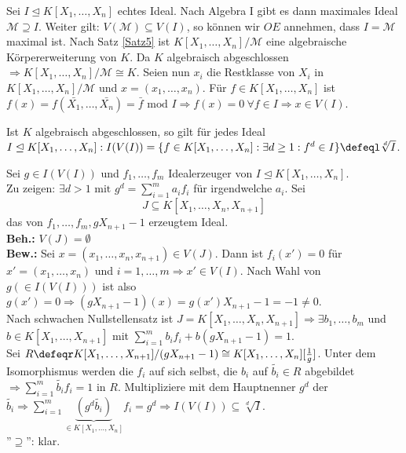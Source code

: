 \begin{Bew}
  Sei $I \trianglelefteq K[X_1, \dots, X_n]$ echtes Ideal. Nach Algebra I gibt es dann maximales Ideal $\mathcal{M} \supseteq I$. Weiter gilt: $V(\mathcal{M}) \subseteq V(I)$, so können wir $O\!\!E$ annehmen, dass $I = \mathcal{M}$ maximal ist.
  Nach Satz \ref{Satz5} ist $K[X_1, \dots, X_n]/\mathcal{M}$ eine algebraische Körpererweiterung von $K$.
  Da $K$ algebraisch abgeschlossen $\Rightarrow K[X_1, \dots, X_n]/\mathcal{M} \cong K$.
  Seien nun $x_i$ die Restklasse von $X_i$ in $K[X_1, \dots, X_n]/\mathcal{M}$ und $x = (x_1, \dots, x_n)$.
  Für $f \in K[X_1, \dots, X_n]$ ist $f(x) = f(\bar{X_1}, \dots, \bar{X_n}) = \bar{f} \mbox{ mod } I \Rightarrow f(x) = 0\ \forall f \in I \Rightarrow x \in V(I)$.
\end{Bew}

\begin{nnSatz}
  Ist $K$ algebraisch abgeschlossen, so gilt für jedes Ideal $I \trianglelefteq K[X_1, \dots, X_n]: I(V(I)) = \{ f \in K[X_1, \dots, X_n]: \exists d \ge 1: f^d \in I \} \defeql \sqrt[d]{I}$.
\end{nnSatz}

\begin{Bew}
  Sei $g \in I(V(I))$ und $f_1, \dots, f_m$ Idealerzeuger von $I \trianglelefteq K[X_1, \dots, X_n]$.\\
  Zu zeigen: $\exists d > 1 \mbox{ mit } g^d = \sum_{i = 1}^m a_i f_i$ für irgendwelche $a_i$.
  Sei 
  \[
  J \subseteq K[X_1, \dots, X_n, X_{n+1}]
  \]
  das von $f_1, \dots, f_m, gX_{n+1}-1$ erzeugtem Ideal.\\
  \textbf{Beh.:} $V(J) = \emptyset$\\
  \textbf{Bew.:} Sei $x = (x_1, \dots, x_n, x_{n+1}) \in V(J)$.
  Dann ist $f_i(x') = 0$ für $x' = (x_1, \dots, x_n)$ und $i = 1, \dots, m \Rightarrow x' \in V(I)$.
  Nach Wahl von $g (\in I(V(I)))$ ist also $g(x') = 0 \Rightarrow (gX_{n+1}-1)(x) = g(x') X_{n+1} - 1 = -1 \not= 0$.\\
  Nach schwachen Nullstellensatz ist $J = K[X_1, \dots, X_n,X_{n+1}] \Rightarrow \exists b_1,
  \dots, b_m$ und $b \in K[X_1, \dots, X_{n+1}]$ mit $\sum_{i=1}^m b_i f_i + b(gX_{n+1} - 1) = 1$.\\
  Sei $R \defeqr K[X_1, \dots, X_{n+1}]/ (gX_{n+1} - 1) \cong K[X_1, \dots, X_n][\frac{1}{g}]$. Unter dem Isomorphismus werden die $f_i$ auf sich selbst, die $b_i$ auf $\tilde{b_i} \in R$ abgebildet $\Rightarrow \sum_{i = 1}^m \tilde{b_i} f_i = 1 \mbox{ in } R$.
  Multipliziere mit dem Hauptnenner $g^d$ der $\tilde{b_i} \Rightarrow \sum_{i = 1}^m \underset{\in K[X_1, \dots, X_n]}{\underbrace{(g^d \tilde{b_i})}} f_i = g^d \Rightarrow I(V(I)) \subseteq \sqrt[d]{I}$.\\
  ''$\supseteq$'': klar.
\end{Bew}
